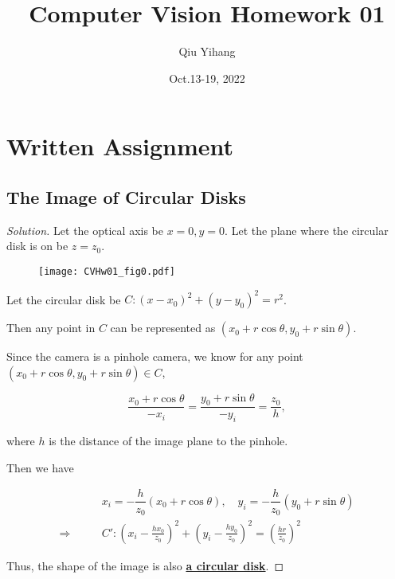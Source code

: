 \documentclass{article}
\title{\textbf{Computer Vision Homework 01}}
\author{Qiu Yihang}
\date{Oct.13-19, 2022}
\newenvironment{solution}{\begin{proof}[\noindent\it Solution]}{\end{proof}}
\begin{document}
\maketitle

\vspace{3em}
\section{Written Assignment}
\vspace{1em}
\subsection{The Image of Circular Disks}
\vspace{1em}
\begin{solution}
    Let the optical axis be $x=0, y=0$.
    Let the plane where the circular disk is on be $z=z_0$. 

    \begin{figure}[htbp]
    	\centering
    	{\texttt{[image: CVHw01\_fig0.pdf]}}
    \end{figure}
    
    \vspace{-1em} \hspace{2.6em}
    Let the circular disk be $C:(x-x_0)^2+(y-y_0)^2=r^2$. 
    
    \hspace{2.6em}
    Then any point in $C$ can be represented as $(x_0+r\cos{\theta},y_0+r\sin{\theta})$.

    \hspace{2.6em}
    Since the camera is a pinhole camera, we know for any point $(x_0+r\cos{\theta},y_0+r\sin{\theta})\in C$,
    
    \vspace{-1em}
    $$\frac{x_0+r\cos{\theta}}{-x_i}=\frac{y_0+r\sin{\theta}}{-y_i}=\frac{z_0}{h},$$
    
    \vspace{-0.3em} \hspace{2.6em}
    where $h$ is the distance of the image plane to the pinhole.
    
    \hspace{2.6em}
    Then we have
    
    \vspace{-2.5em}
    \begin{align*}
        & x_i = -\dfrac{h}{z_0}\left(x_0+r\cos{\theta}\right),\quad
        y_i = -\dfrac{h}{z_0}\left(y_0+r\sin{\theta}\right) \\
        \Longrightarrow \qquad & C':\left(x_i-\frac{hx_0}{z_0}\right)^2+\left(y_i-\frac{hy_0}{z_0}\right)^2=\left(\frac{hr}{z_0}\right)^2
    \end{align*}
    
    \hspace{2.6em}
    Thus, the shape of the image is also \underline{\textbf{a circular disk}}.
\end{solution}
\end{document}
